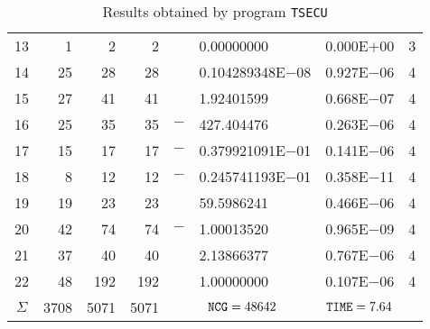 \documentclass{esub2acm}
\begin{document}
\begin{table}
\begin{tabular}{c|rrrr@{}lcc}
13  &   1   &   2   &   2   &       &   0.00000000  &   0.000E$+$00 &   3   \\
14  &   25  &   28  &   28  &       &   0.104289348E$-$08   &   0.927E$-$06 &   4   \\
15  &   27  &   41  &   41  &       &   1.92401599  &   0.668E$-$07 &   4   \\
16  &   25  &   35  &   35  &   $-$ &   427.404476  &   0.263E$-$06 &   4   \\
17  &   15  &   17  &   17  &   $-$ &   0.379921091E$-$01   &   0.141E$-$06 &   4   \\
18  &   8   &   12  &   12  &   $-$ &   0.245741193E$-$01   &   0.358E$-$11 &   4   \\
19  &   19  &   23  &   23  &       &   59.5986241  &   0.466E$-$06 &   4   \\
20  &   42  &   74  &   74  &   $-$ &   1.00013520  &   0.965E$-$09 &   4   \\
21  &   37  &   40  &   40  &       &   2.13866377  &   0.767E$-$06 &   4   \\
22  &   48  &   192 &   192 &       &   1.00000000  &   0.107E$-$06 &   4   \\ \hline
$\Sigma$\rule[-2pt]{0pt}{12pt}  &   3708    &   5071    &   5071    &   \multicolumn{2}{c}{${\tt NCG} = 48642$}  &   ${\tt TIME} = 7.64$ &  \\ \hline
\end{tabular}
\caption{Results obtained by program {\tt TSECU}}
\label{tsecu}
\end{table}
\end{document}
